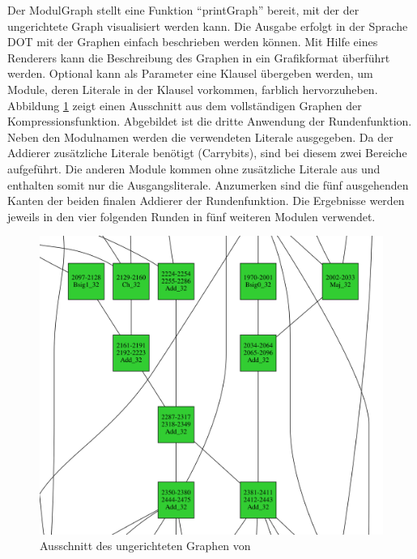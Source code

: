 Der ModulGraph stellt eine Funktion "`printGraph"' bereit, mit der der ungerichtete Graph visualisiert werden kann. Die Ausgabe erfolgt in der Sprache DOT \cite{lang:dot}
mit der Graphen einfach beschrieben werden können. Mit Hilfe eines Renderers kann die Beschreibung des Graphen in ein Grafikformat überführt werden.
Optional kann als Parameter eine Klausel übergeben werden, um Module, deren Literale in der Klausel vorkommen, farblich hervorzuheben. Abbildung \ref{fig:sha256_graph}
zeigt einen Ausschnitt aus dem vollständigen Graphen der Kompressionsfunktion. Abgebildet ist die dritte Anwendung der Rundenfunktion. Neben den
Modulnamen werden die verwendeten Literale ausgegeben. Da der Addierer zusätzliche Literale benötigt (Carrybits), sind bei diesem zwei Bereiche aufgeführt.
Die anderen Module kommen ohne zusätzliche Literale aus und enthalten somit nur die Ausgangsliterale. Anzumerken sind die fünf ausgehenden Kanten der beiden
finalen Addierer der Rundenfunktion. Die Ergebnisse werden jeweils in den vier folgenden Runden in fünf weiteren Modulen verwendet.
\begin{figure}[!h]
  \centering
  \includegraphics[scale=0.43]{images/sha256graph}
  \caption{Ausschnitt des ungerichteten Graphen von }
  \label{fig:sha256_graph}
\end{figure}

